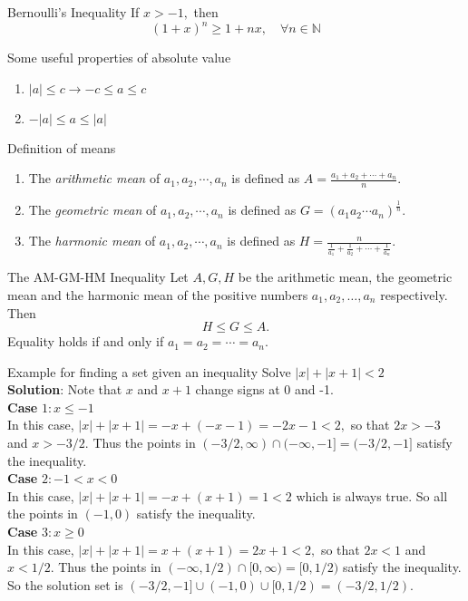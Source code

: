 \documentclass[10pt,landscape]{article}
\theoremstyle{definition}
\newcommand{\thistheoremname}{}
\newtheorem*{genericthm*}{\thistheoremname}
\newenvironment{namedthm*}[1]
{\renewcommand{\thistheoremname}{#1}\begin{genericthm*}}
{\end{genericthm*}}
\begin{document}
\begin{multicols}{3}
\begin{namedthm*}{Bernoulli's Inequality}
    If $x>-1,$ then
$$
(1+x)^{n} \geq 1+n x, \quad \forall n \in \mathbb{N}
$$
\end{namedthm*}
\begin{namedthm*}{Some useful properties of absolute value}
~\begin{enumerate}
    \item $|a| \leq c \rightarrow -c \leq a \leq c$
    \item $-|a| \leq a \leq |a|$
\end{enumerate}
\end{namedthm*}
\begin{namedthm*}{Definition of means}
  ~
    \begin{enumerate}
        \item The \textit{arithmetic mean} of $a_{1},a_{2},\cdots,a_{n}$ is defined as $A=\frac{a_{1} + a_{2}+\cdots+a_{n}}{n}$.
        \item The \textit{geometric mean} of $a_{1},a_{2},\cdots,a_{n}$ is defined as $G=(a_{1}a_{2} \cdots a_{n})^{\frac{1}{n}}$.
        \item The \textit{harmonic mean} of $a_{1},a_{2},\cdots,a_{n}$ is defined as $H=\frac{n}{\frac{1}{a_1} + \frac{1}{a_2} + \cdots + \frac{1}{a_n}}$.
    \end{enumerate}
\end{namedthm*}



\begin{namedthm*}{The AM-GM-HM Inequality}
Let $A, G, H$ be the arithmetic mean, the geometric mean and
the harmonic mean of the positive numbers $a_{1}, a_{2}, \ldots, a_{n}$ respectively. Then
$$
H \leq G \leq A .
$$
Equality holds if and only if $a_{1}=a_{2}=\cdots=a_{n} .$
\end{namedthm*}

\begin{namedthm*}{Example for finding a set given an inequality}
Solve $|x|+|x+1|<2$\\
\textbf{Solution}: Note that $x$ and $x+1$ change signs at 0 and -1.\\
\textbf{Case} $1 : x \leq-1$\\
In this case, $|x| + |x+1|=-x+(-x-1)=-2 x-1<2,$ so that $2 x>-3$ and $x>-3 / 2 .$ Thus
the points in $(-3 / 2, \infty) \cap(-\infty,-1]=(-3 / 2,-1]$ satisfy the inequality.
\\\textbf{Case} $2 :-1<x<0$\\
In this case, $|x|+|x+1|=-x+(x+1)=1<2$ which is always true. So all the points in $(-1,0)$
satisfy the inequality.\\
\textbf{Case} $3 : x \geq 0$\\
In this case, $|x|+|x+1|=x+(x+1)=2 x+1<2,$ so that $2 x<1$ and $x<1 / 2 .$ Thus the points
in $(-\infty, 1 / 2) \cap[0, \infty)=[0,1 / 2)$ satisfy the inequality.\\
So the solution set is $(-3 / 2,-1] \cup(-1,0) \cup[0,1 / 2)=(-3 / 2,1 / 2)$.
\end{namedthm*}


\end{multicols}
\end{document}
